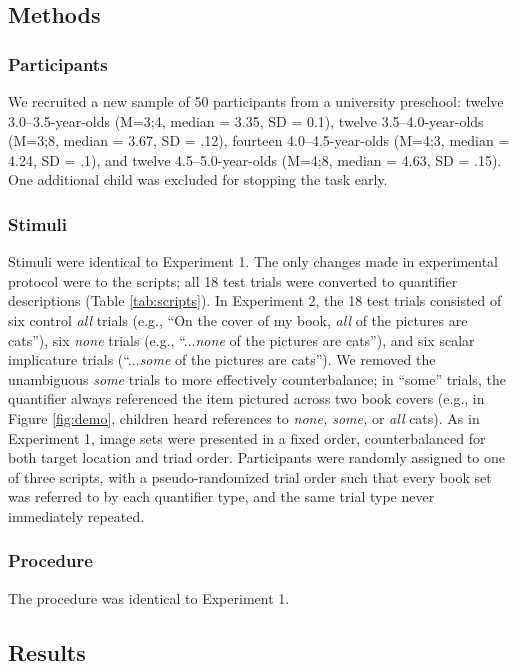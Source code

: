 \documentclass[man]{apa2}
\begin{document}
\subsection{Methods}
\subsubsection{Participants} 

We recruited a new sample of 50 participants from a university preschool: twelve 3.0--3.5-year-olds (M=3;4, median = 3.35, SD = 0.1), twelve 3.5--4.0-year-olds (M=3;8, median = 3.67, SD = .12), fourteen 4.0--4.5-year-olds (M=4;3, median = 4.24, SD = .1), and twelve 4.5--5.0-year-olds (M=4;8, median = 4.63, SD = .15). One additional child was excluded for stopping the task early.

\subsubsection{Stimuli}
Stimuli were identical to Experiment 1. The only changes made in experimental protocol were to the scripts;  all 18 test trials were converted to quantifier descriptions (Table \ref{tab:scripts}). In Experiment 2, the 18 test trials consisted of six control \textit{all} trials (e.g., ``On the cover of my book, \textit{all} of the pictures are cats''), six \textit{none} trials (e.g., ``...\textit{none} of the pictures are cats''), and six scalar implicature trials (``...\textit{some} of the pictures are cats''). We removed the unambiguous \textit{some} trials to more effectively counterbalance; in ``some'' trials, the quantifier always referenced the item pictured across two book covers (e.g., in Figure \ref{fig:demo}, children heard references to \textit{none, some,} or \textit{all} cats). As in Experiment 1, image sets were presented in a fixed order, counterbalanced for both target location and triad order. Participants were randomly assigned to one of three scripts, with a pseudo-randomized trial order such that every book set was referred to by each quantifier type, and the same trial type never immediately repeated.

\subsubsection{Procedure}
The procedure was identical to Experiment 1. 

\subsection{Results}
\end{document}
